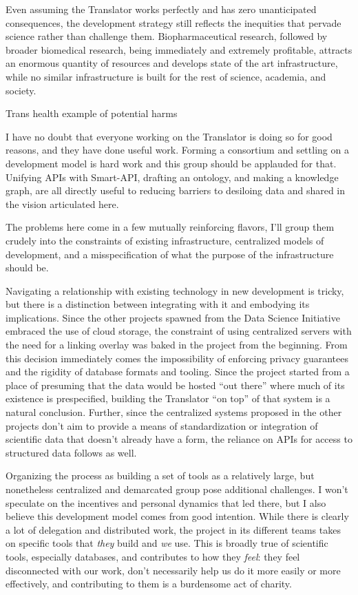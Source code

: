 \documentclass[notoc]{tufte-book}
\begin{document}
Even assuming the Translator works perfectly and has zero unanticipated
consequences, the development strategy still reflects the inequities
that pervade science rather than challenge them. Biopharmaceutical
research, followed by broader biomedical research, being immediately and
extremely profitable, attracts an enormous quantity of resources and
develops state of the art infrastructure, while no similar
infrastructure is built for the rest of science, academia, and society.

Trans health {example of potential harms}

I have no doubt that everyone working on the Translator is doing so for
good reasons, and they have done useful work. Forming a consortium and
settling on a development model is hard work and this group should be
applauded for that. Unifying APIs with Smart-API, drafting an ontology,
and making a knowledge graph, are all directly useful to reducing
barriers to desiloing data and shared in the vision articulated here.

The problems here come in a few mutually reinforcing flavors, I'll group
them crudely into the constraints of existing infrastructure,
centralized models of development, and a misspecification of what the
purpose of the infrastructure should be.

Navigating a relationship with existing technology in new development is
tricky, but there is a distinction between integrating with it and
embodying its implications. Since the other projects spawned from the
Data Science Initiative embraced the use of cloud storage, the
constraint of using centralized servers with the need for a linking
overlay was baked in the project from the beginning. From this decision
immediately comes the impossibility of enforcing privacy guarantees and
the rigidity of database formats and tooling. Since the project started
from a place of presuming that the data would be hosted ``out there''
where much of its existence is prespecified, building the Translator
``on top'' of that system is a natural conclusion. Further, since the
centralized systems proposed in the other projects don't aim to provide
a means of standardization or integration of scientific data that
doesn't already have a form, the reliance on APIs for access to
structured data follows as well.

Organizing the process as building a set of tools as a relatively large,
but nonetheless centralized and demarcated group pose additional
challenges. I won't speculate on the incentives and personal dynamics
that led there, but I also believe this development model comes from
good intention. While there is clearly a lot of delegation and
distributed work, the project in its different teams takes on specific
tools that \emph{they} build and \emph{we} use. This is broadly true of
scientific tools, especially databases, and contributes to how they
\emph{feel}: they feel disconnected with our work, don't necessarily
help us do it more easily or more effectively, and contributing to them
is a burdensome act of charity.
\end{document}
